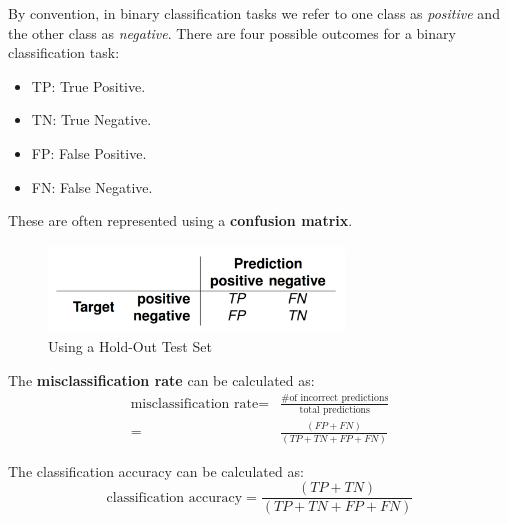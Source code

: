 \documentclass[a4paper,11pt]{article}
\begin{document}
By convention, in binary classification tasks we refer to one class as \textit{positive} and the other class as \textit{negative}.
There are four possible outcomes for a binary classification task:
\begin{multicols}{2}
    \begin{itemize}
        \item   TP: True Positive.
        \item   TN: True Negative.
        \item   FP: False Positive.
        \item   FN: False Negative.
    \end{itemize}
\end{multicols}

These are often represented using a \textbf{confusion matrix}.
\begin{figure}[H]
    \centering
    \includegraphics[width=0.7\textwidth]{images/confmatrix.png}
    \caption{Using a Hold-Out Test Set}
\end{figure}

The \textbf{misclassification rate} can be calculated as:
\begin{align*}
    \text{misclassification rate}  =& \frac{\text{\# of incorrect predictions}}{\text{total predictions}} \\
    =& \frac{(\textit{FP} + \textit{FN})}{(\textit{TP} + \textit{TN} + \textit{FP} + \textit{FN})}
\end{align*}

The classification accuracy can be calculated as:
\[
    \text{classification accuracy} = \frac{(\textit{TP} + \textit{TN})}{(\textit{TP} + \textit{TN} + \textit{FP} + \textit{FN})}
\]
\end{document}
